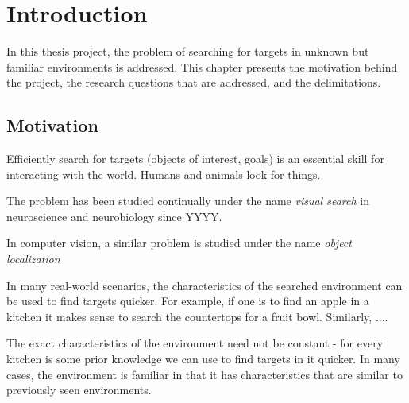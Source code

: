 \chapter{Introduction}
\label{cha:introduction}


In this thesis project, the problem of searching for targets in unknown but familiar environments is addressed. This chapter presents the motivation behind the project, the research questions that are addressed, and the delimitations. 

\section{Motivation}
\label{sec:motivation}

Efficiently search for targets (objects of interest, goals) is an essential skill for interacting with the world. Humans and animals look for things.



The problem has been studied continually under the name \textit{visual search} in neuroscience and neurobiology since YYYY. 

In computer vision, a similar problem is studied under the name \textit{object localization}

In many real-world scenarios, the characteristics of the searched environment can be used to find targets quicker. For example, if one is to find an apple in a kitchen it makes sense to search the countertops for a fruit bowl. Similarly, ....

The exact characteristics of the environment need not be constant - for every kitchen is some prior knowledge we can use to find targets in it quicker. In many cases, the environment is familiar in that it has characteristics that are similar to previously seen environments.


